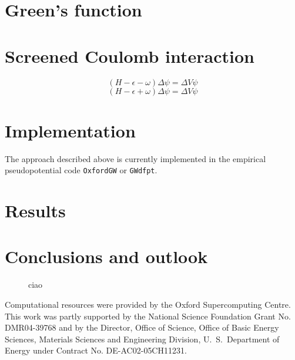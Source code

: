 \documentclass[twocolumn,prb,showpacs,superscriptaddress]{revtex4}
\def\w{\omega}
\begin{document}
\section{Green's function}

\section{Screened Coulomb interaction}

\begin{equation}\label{eq.linsys.1}
(H - \epsilon -\w) \Delta\psi = \Delta V \psi
\end{equation}
\begin{equation}\label{eq.linsys.2}
(H - \epsilon +\w) \Delta\psi = \Delta V \psi
\end{equation}

\section{Implementation}

The approach described above is currently implemented in the empirical
pseudopotential code {\tt OxfordGW} or {\tt GWdfpt}. 

\section{Results}

\section{Conclusions and outlook}

\begin  {figure}
\begin  {center}
\end    {center}
\caption{\label{fig1} 
        ciao
        }
\end    {figure}

\begin{acknowledgments}
Computational resources were provided by the Oxford Supercomputing Centre.
This work was partly supported by the National Science Foundation Grant No. DMR04-39768 and by
the Director, Office of Science, Office of Basic Energy Sciences, Materials Sciences
and Engineering Division, U.\ S.\ Department of Energy under Contract No. DE-AC02-05CH11231.
\end{acknowledgments}

\appendix
\end{document}
